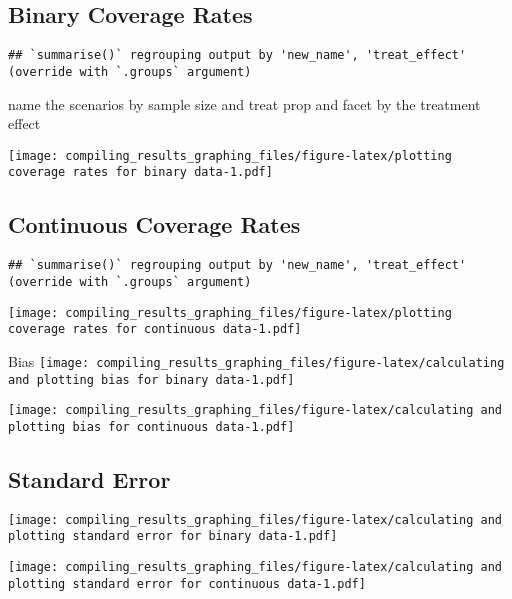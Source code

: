 \documentclass[
]{article}
\newenvironment{Shaded}{\begin{snugshade}}{\end{snugshade}}
\newcommand{\KeywordTok}[1]{\textcolor[rgb]{0.13,0.29,0.53}{\textbf{#1}}}
\newcommand{\NormalTok}[1]{#1}
\newcommand{\OperatorTok}[1]{\textcolor[rgb]{0.81,0.36,0.00}{\textbf{#1}}}
\newcommand{\StringTok}[1]{\textcolor[rgb]{0.31,0.60,0.02}{#1}}
\begin{document}
\begin{Shaded}
\end{Shaded}

\hypertarget{binary-coverage-rates}{%
\subsection{Binary Coverage Rates}\label{binary-coverage-rates}}

\begin{verbatim}
## `summarise()` regrouping output by 'new_name', 'treat_effect' (override with `.groups` argument)
\end{verbatim}

name the scenarios by sample size and treat prop and facet by the
treatment effect

\texttt{[image: compiling\_results\_graphing\_files/figure-latex/plotting coverage rates for binary data-1.pdf]}

\hypertarget{continuous-coverage-rates}{%
\subsection{Continuous Coverage Rates}\label{continuous-coverage-rates}}

\begin{verbatim}
## `summarise()` regrouping output by 'new_name', 'treat_effect' (override with `.groups` argument)
\end{verbatim}

\texttt{[image: compiling\_results\_graphing\_files/figure-latex/plotting coverage rates for continuous data-1.pdf]}

Bias
\texttt{[image: compiling\_results\_graphing\_files/figure-latex/calculating and plotting bias for binary data-1.pdf]}

\texttt{[image: compiling\_results\_graphing\_files/figure-latex/calculating and plotting bias for continuous data-1.pdf]}

\hypertarget{standard-error}{%
\subsection{Standard Error}\label{standard-error}}

\texttt{[image: compiling\_results\_graphing\_files/figure-latex/calculating and plotting standard error for binary data-1.pdf]}

\texttt{[image: compiling\_results\_graphing\_files/figure-latex/calculating and plotting standard error for continuous data-1.pdf]}
\end{document}
